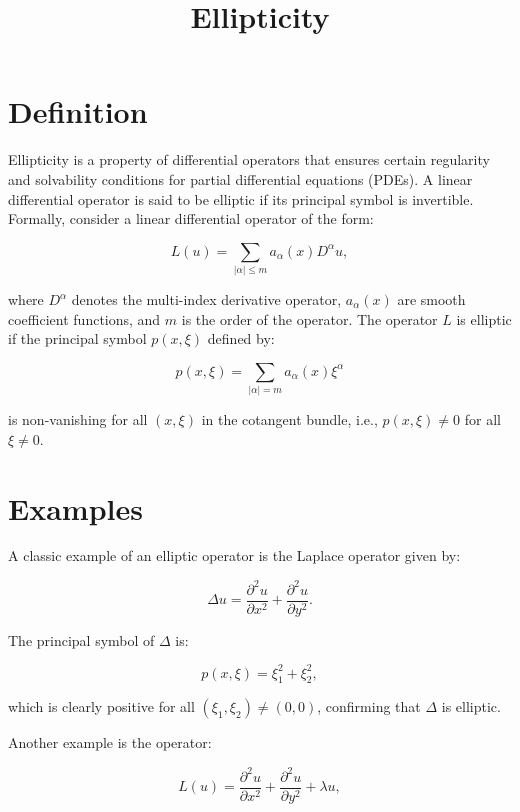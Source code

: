 \documentclass[11pt,a4paper]{article}
\title{Ellipticity}
\date{}
\begin{document}
\maketitle
\section{Definition}
Ellipticity is a property of differential operators that ensures certain regularity and solvability conditions for partial differential equations (PDEs). A linear differential operator is said to be elliptic if its principal symbol is invertible. Formally, consider a linear differential operator of the form:

\begin{equation}
L(u) = \sum_{|\alpha| \leq m} a_\alpha(x) D^\alpha u,
\end{equation}

where \(D^\alpha\) denotes the multi-index derivative operator, \(a_\alpha(x)\) are smooth coefficient functions, and \(m\) is the order of the operator. The operator \(L\) is elliptic if the principal symbol \(p(x, \xi)\) defined by:

\begin{equation}
p(x, \xi) = \sum_{|\alpha| = m} a_\alpha(x) \xi^\alpha
\end{equation}

is non-vanishing for all \((x, \xi)\) in the cotangent bundle, i.e., \(p(x, \xi) \neq 0\) for all \(\xi \neq 0\).

\section{Examples}
A classic example of an elliptic operator is the Laplace operator given by:

\begin{equation}
\Delta u = \frac{\partial^2 u}{\partial x^2} + \frac{\partial^2 u}{\partial y^2}.
\end{equation}

The principal symbol of \(\Delta\) is:

\begin{equation}
p(x, \xi) = \xi_1^2 + \xi_2^2,
\end{equation}

which is clearly positive for all \((\xi_1, \xi_2) \neq (0, 0)\), confirming that \(\Delta\) is elliptic.

Another example is the operator:

\begin{equation}
L(u) = \frac{\partial^2 u}{\partial x^2} + \frac{\partial^2 u}{\partial y^2} + \lambda u,
\end{equation}
\end{document}
